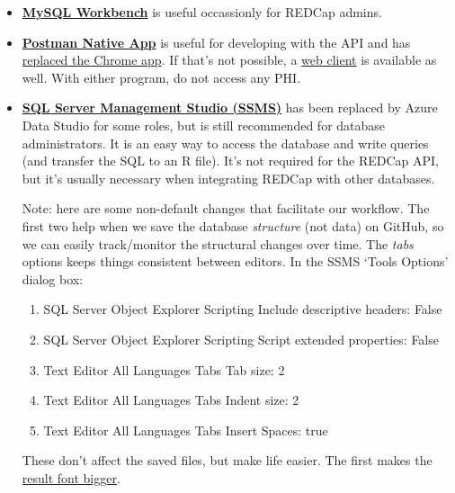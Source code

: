 \documentclass[
]{book}
\providecommand{\tightlist}{%
  \setlength{\itemsep}{0pt}\setlength{\parskip}{0pt}}
\begin{document}
\begin{itemize}
\item
  \textbf{\href{https://dev.mysql.com/downloads/workbench/}{MySQL Workbench}} is useful occassionly for REDCap admins.
\item
  \textbf{\href{https://www.getpostman.com/downloads/}{Postman Native App}} is useful for developing with the API and has \href{https://blog.getpostman.com/2017/03/14/going-native/}{replaced the Chrome app}. If that's not possible, a \href{https://web.postman.co/}{web client} is available as well. With either program, do not access any PHI.
\item
  \textbf{\href{https://docs.microsoft.com/en-us/sql/ssms/download-sql-server-management-studio-ssms}{SQL Server Management Studio (SSMS)}} has been replaced by Azure Data Studio for some roles, but is still recommended for database administrators. It is an easy way to access the database and write queries (and transfer the SQL to an R file). It's not required for the REDCap API, but it's usually necessary when integrating REDCap with other databases.

  Note: here are some non-default changes that facilitate our workflow. The first two help when we save the database \emph{structure} (not data) on GitHub, so we can easily track/monitor the structural changes over time. The \emph{tabs} options keeps things consistent between editors. In the SSMS `Tools \textbar{} Options' dialog box:

  \begin{enumerate}
  \def\labelenumi{\arabic{enumi}.}
  \tightlist
  \item
    SQL Server Object Explorer \textbar{} Scripting \textbar{} Include descriptive headers: False
  \item
    SQL Server Object Explorer \textbar{} Scripting \textbar{} Script extended properties: False
  \item
    Text Editor \textbar{} All Languages \textbar{} Tabs \textbar{} Tab size: 2
  \item
    Text Editor \textbar{} All Languages \textbar{} Tabs \textbar{} Indent size: 2
  \item
    Text Editor \textbar{} All Languages \textbar{} Tabs \textbar{} Insert Spaces: true
  \end{enumerate}

  These don't affect the saved files, but make life easier. The first makes the \href{https://blog.sqlauthority.com/2016/05/31/sql-server-ssms-tip-get-larger-fonts-results-grid-output/}{result font bigger}.


\end{itemize}
\end{document}

